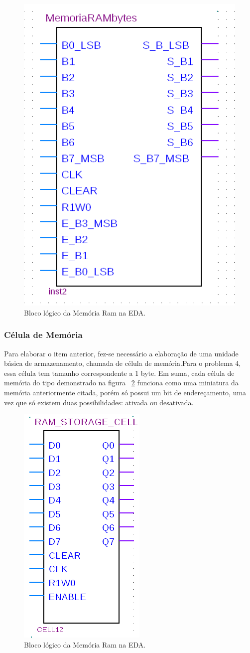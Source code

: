 \documentclass[12pt]{article}
\begin{document}
\begin{figure}[h]
\centering
\includegraphics[width=.3\textwidth]{img/ram15bytes.png}
\caption{Bloco lógico da Memória Ram na EDA.}
\label{fig:ram15}
\end{figure}

\subsubsection{Célula de Memória}

Para elaborar o item anterior, fez-se necessário a elaboração de uma unidade básica de armazenamento, chamada de célula de memória.Para o problema 4, essa célula tem tamanho correspondente a 1 byte. Em suma, cada célula de memória do tipo demonstrado na figura ~\ref{fig:celulamemoria} funciona como uma miniatura da memória anteriormente citada, porém só possui um bit de endereçamento, uma vez que só existem duas possibilidades: ativada ou desativada.

\begin{figure}[h]
\centering
\includegraphics[width=.3\textwidth]{img/celulamemoria.png}
\caption{Bloco lógico da Memória Ram na EDA.}
\label{fig:celulamemoria}
\end{figure}
\end{document}
